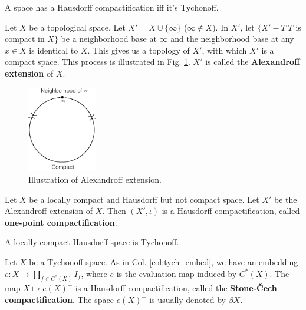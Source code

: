 \documentclass[12pt]{book}
\begin{document}
\begin{lemma}
	A space has a Hausdorff compactification iff it's Tychonoff.
\end{lemma}

\begin{definition}
	Let $X$ be a topological space. Let $X'=X\cup\{\infty\}$ ($\infty\not\in X$). In $X'$, let $\{X'-T| T$ is compact in $X\}$ be a neighborhood base at $\infty$ and the neighborhood base at any $x\in X$ is identical to $X$. This gives us a topology of $X'$, with which $X'$ is a compact space. This process is illustrated in Fig. \ref{fig:1p_compact}. $X'$ is called the {\bf Alexandroff extension} of $X$.
\end{definition}

\begin{figure}[htb!]
	\centering  
	\includegraphics[width=0.27\textwidth ]{resources/chap_compact/one-point-comp.pdf}  
	\caption{Illustration of Alexandroff extension.}
	\label{fig:1p_compact}
\end{figure}

\begin{lemma}
	 Let $X$ be a locally compact and Hausdorff but not compact space. Let $X'$ be the Alexandroff extension of $X$. Then $(X',\iota)$ is a Hausdorff compactification, called {\bf one-point compactification}.
\end{lemma}

\begin{corollary}
	A locally compact Hausdorff space is Tychonoff.
\end{corollary}

\begin{definition}
	Let $X$ be a Tychonoff space.  As in Col. \ref{col:tych_embed}, we have an embedding $e:X\mapsto \prod_{f\in C^*(X)} I_f$, where $e$ is the evaluation map induced by $C^*(X)$. The map $X\mapsto e(X)^-$ is a Hausdorff compactification, called the {\bf Stone-\v Cech compactification}. The space $e(X)^-$ is usually denoted by $\beta X$.
\end{definition}
\end{document}
